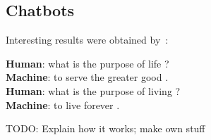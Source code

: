 \subsection{Chatbots}%
\label{subsec:chatbots}%

Interesting results were obtained by~\cite{vinyals2015neural}:
\begin{displayquote}
\textbf{Human}: what is the purpose of life ?\\
\textbf{Machine}: to serve the greater good .\\
\textbf{Human}: what is the purpose of living ?\\
\textbf{Machine}: to live forever .
\end{displayquote}

TODO: Explain how it works; make own stuff